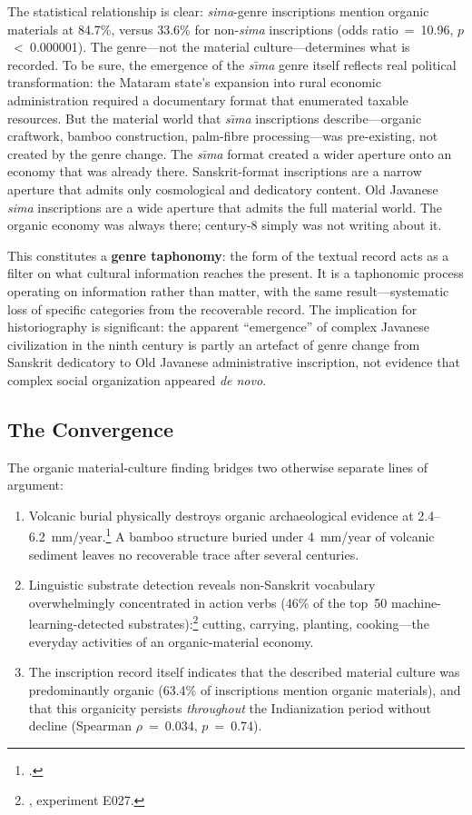 \documentclass[12pt,a4paper]{article}
\begin{document}
The statistical relationship is clear: \emph{sima}-genre inscriptions mention organic materials at 84.7\%, versus 33.6\% for non-\emph{sima} inscriptions (odds ratio~=~10.96, $p$~<~0.000001). The genre---not the material culture---determines what is recorded. To be sure, the emergence of the \emph{s\={\i}ma} genre itself reflects real political transformation: the Mataram state's expansion into rural economic administration required a documentary format that enumerated taxable resources. But the material world that \emph{s\={\i}ma} inscriptions describe---organic craftwork, bamboo construction, palm-fibre processing---was pre-existing, not created by the genre change. The \emph{s\={\i}ma} format created a wider aperture onto an economy that was already there. Sanskrit-format inscriptions are a narrow aperture that admits only cosmological and dedicatory content. Old Javanese \emph{sima} inscriptions are a wide aperture that admits the full material world. The organic economy was always there; century-8 simply was not writing about it.

This constitutes a \textbf{genre taphonomy}: the form of the textual record acts as a filter on what cultural information reaches the present. It is a taphonomic process operating on information rather than matter, with the same result---systematic loss of specific categories from the recoverable record. The implication for historiography is significant: the apparent ``emergence'' of complex Javanese civilization in the ninth century is partly an artefact of genre change from Sanskrit dedicatory to Old Javanese administrative inscription, not evidence that complex social organization appeared \emph{de novo}.

\subsection{The Convergence}

The organic material-culture finding bridges two otherwise separate lines of argument:

\begin{enumerate}
\item Volcanic burial physically destroys organic archaeological evidence at 2.4--6.2~mm/year.\footnote{\autocite{amien2026a}.} A bamboo structure buried under 4~mm/year of volcanic sediment leaves no recoverable trace after several centuries.

\item Linguistic substrate detection reveals non-Sanskrit vocabulary overwhelmingly concentrated in action verbs (46\% of the top~50 machine-learning-detected substrates):\footnote{\autocite{amien2026d}, experiment E027.} cutting, carrying, planting, cooking---the everyday activities of an organic-material economy.

\item The inscription record itself indicates that the described material culture was predominantly organic (63.4\% of inscriptions mention organic materials), and that this organicity persists \emph{throughout} the Indianization period without decline (Spearman $\rho$~=~0.034, $p$~=~0.74).
\end{enumerate}
\end{document}
